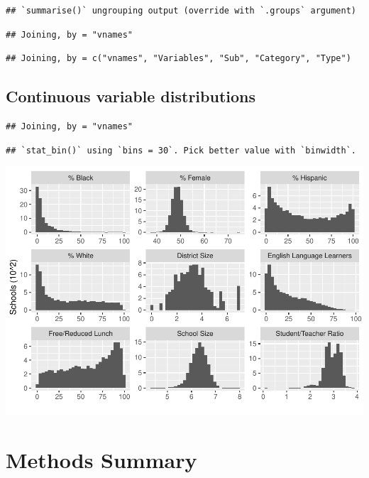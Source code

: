 \documentclass[
  english,
  man,floatsintext]{apa6}
\begin{document}
\begin{verbatim}
## `summarise()` ungrouping output (override with `.groups` argument)
\end{verbatim}

\begin{verbatim}
## Joining, by = "vnames"
\end{verbatim}

\begin{verbatim}
## Joining, by = c("vnames", "Variables", "Sub", "Category", "Type")
\end{verbatim}

\hypertarget{continuous-variable-distributions}{%
\subsection{Continuous variable distributions}\label{continuous-variable-distributions}}

\begin{verbatim}
## Joining, by = "vnames"
\end{verbatim}

\begin{verbatim}
## `stat_bin()` using `bins = 30`. Pick better value with `binwidth`.
\end{verbatim}

\includegraphics{5---Analysis_files/figure-latex/unnamed-chunk-2-1.pdf}

\hypertarget{methods-summary}{%
\section{Methods Summary}\label{methods-summary}}
\end{document}
